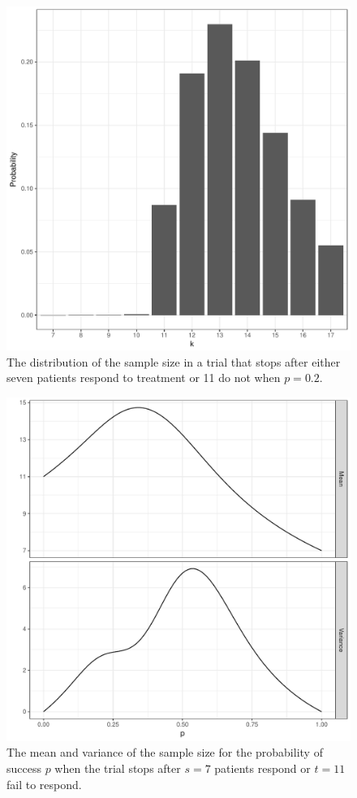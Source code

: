 \documentclass[sii]{ipart}
\begin{document}
\begin{figure}[htbp!]
\centering
\includegraphics[width=\textwidth]{snb-first-plot.pdf}
\caption{
The distribution of the sample size in a trial that stops after either seven patients
respond to treatment or 11 do not when $p=0.2$.
}
\label{fig:kane_viz_1}
\end{figure}

\pagebreak

\begin{figure}[htbp!]
\centering
\includegraphics[width=\textwidth]{mean-and-variance.pdf}
\caption{
The mean and variance of the sample size for the probability of success $p$ 
when the trial stops after $s=7$ patients respond or $t=11$ fail to respond.
}
\label{fig:kane_viz_2}
\end{figure}
\end{document}
